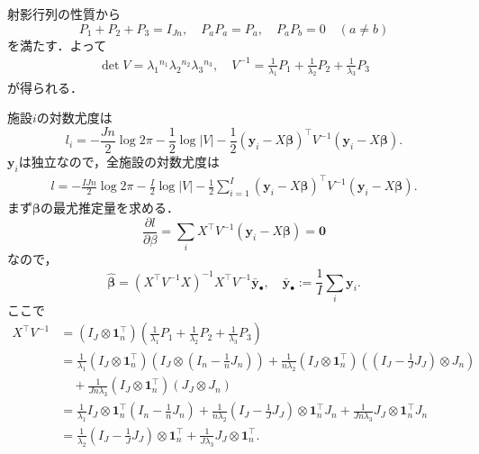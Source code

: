 射影行列の性質から
\[ P_1 + P_2 + P_3 = I_{Jn} , \quad P_aP_a = P_a , \quad P_aP_b = 0 \quad (a \neq b) \]
を満たす．よって
\begin{align}
  \det V = \lambda_1{}^{n_1} \lambda_2{}^{n_2} \lambda_3{}^{n_3} , \quad
  V^{-1} = \frac{1}{\lambda_1} P_1 + \frac{1}{\lambda_2} P_2 + \frac{1}{\lambda_3} P_3
  \label{12_49_V_decomp_corollary}
\end{align}
が得られる．

施設\(i\)の対数尤度は
\[
l_i = -\frac{Jn}{2} \log 2\pi - \frac{1}{2} \log \lvert V \rvert
 - \frac{1}{2} (\boldsymbol{y}_i - X \boldsymbol\beta)^\top V^{-1} (\boldsymbol{y}_i - X \boldsymbol\beta) .
\]
\(\boldsymbol{y}_i\)は独立なので，全施設の対数尤度は
\begin{align}
  l = -\frac{IJn}{2} \log 2\pi - \frac{I}{2} \log \lvert V \rvert
    - \frac{1}{2} \sum_{i=1}^I (\boldsymbol{y}_i - X \boldsymbol\beta)^\top V^{-1} (\boldsymbol{y}_i - X \boldsymbol\beta) .
  \label{12_49_ll_all_inst}
\end{align}
まず\(\boldsymbol\beta\)の最尤推定量を求める．
\[
\frac{\partial l}{\partial \beta} = \sum_i X^\top V^{-1} (\boldsymbol{y}_i - X \boldsymbol\beta) = \boldsymbol{0}
\]
なので，
\[
\hat{\boldsymbol\beta} = (X^\top V^{-1}X)^{-1} X^\top V^{-1} \bar{\boldsymbol{y}}_\bullet
, \quad
\bar{\boldsymbol{y}}_\bullet := \frac{1}{I} \sum_i \boldsymbol{y}_i .
\]
ここで
\begin{align*}
  X^\top V^{-1}
  &= (I_J \otimes \boldsymbol{1}_n^\top)
  \left( \frac{1}{\lambda_1} P_1 + \frac{1}{\lambda_2} P_2 + \frac{1}{\lambda_3} P_3 \right) \\
  &= \frac{1}{\lambda_1} (I_J \otimes \boldsymbol{1}_n^\top) \left( I_J \otimes \left( I_n - \frac{1}{n} J_n \right) \right)
  + \frac{1}{n\lambda_2} (I_J \otimes \boldsymbol{1}_n^\top) \left( \left( I_J - \frac{1}{J} J_J \right) \otimes J_n \right) \\
  &\quad + \frac{1}{Jn\lambda_3} (I_J \otimes \boldsymbol{1}_n^\top) \left( J_J \otimes J_n \right) \\
  &= \frac{1}{\lambda_1} I_J \otimes \boldsymbol{1}_n^\top \left( I_n - \frac{1}{n} J_n \right)
  + \frac{1}{n\lambda_2} \left( I_J - \frac{1}{J} J_J \right) \otimes \boldsymbol{1}_n^\top J_n
  + \frac{1}{Jn\lambda_3} J_J \otimes \boldsymbol{1}_n^\top J_n \\
  &= \frac{1}{\lambda_2} \left( I_J - \frac{1}{J} J_J \right) \otimes \boldsymbol{1}_n^\top
  + \frac{1}{J\lambda_3} J_J \otimes \boldsymbol{1}_n^\top .
\end{align*}
